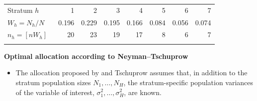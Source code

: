\documentclass{my_eth_beamer}
\numberwithin{equation}{section}
\begin{document}
\begin{frame}
    \begin{Bsp_forts}[Cont.]
        {\small
        \vspace{0.5em}
        \begin{center}
        \begin{tabular}{lrrrrrrr}
            \toprule
            \addlinespace
            Stratum $h$ & 1 & 2 & 3 & 4 & 5 & 6 & 7\\
            \addlinespace
            \midrule
            $W_h = N_h/N \quad$ & 0.196 & 0.229 & 0.195 & 0.166 & 0.084 &
                0.056 & 0.074\\[0.5em]
            $n_h = [n W_h]$ & 20 & 23 & 19 & 17 & 8 & 6 & 7\\
            \addlinespace
            \bottomrule
        \end{tabular}
        \end{center}
        }
        \vspace{0.25em}
    \end{Bsp_forts}
    \vspace{1em}
    \noindent\textcolor{fhnwblue}{\bfseries Optimal allocation according to
    Neyman--Tschuprow}
    \begin{itemize}
    \setlength{\itemsep}{8pt}
        \item The allocation proposed by \citet{neyman_1934} and Tschuprow
            \citep[see][]{dalenius_1992} assumes that, \alert{in addition} to
            the stratum population sizes $N_1, \ldots, N_H$, the
            \alert{stratum-specific population variances} of the variable of
            interest, $\sigma_{1}^2, \ldots, \sigma_{H}^2$, are known.
   \end{itemize}
\end{frame}
\end{document}
